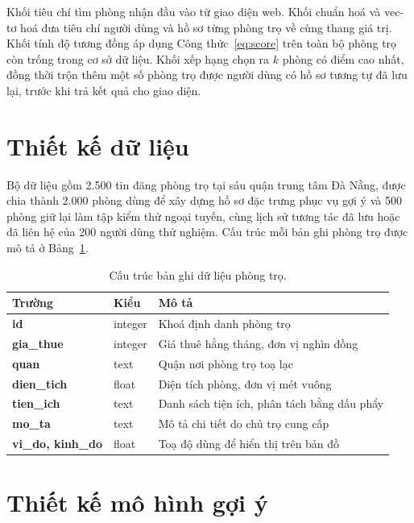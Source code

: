 Khối tiêu chí tìm phòng nhận đầu vào từ giao diện web. Khối chuẩn hoá và
vec-tơ hoá đưa tiêu chí người dùng và hồ sơ từng phòng trọ về cùng thang
giá trị. Khối tính độ tương đồng áp dụng Công thức~\eqref{eq:score} trên
toàn bộ phòng trọ còn trống trong cơ sở dữ liệu. Khối xếp hạng chọn ra
$k$ phòng có điểm cao nhất, đồng thời trộn thêm một số phòng trọ được người
dùng có hồ sơ tương tự đã lưu lại, trước khi trả kết quả cho giao diện.

\section{Thiết kế dữ liệu}

Bộ dữ liệu gồm 2.500 tin đăng phòng trọ tại sáu quận trung tâm Đà Nẵng,
được chia thành 2.000 phòng dùng để xây dựng hồ sơ đặc trưng phục vụ gợi ý
và 500 phòng giữ lại làm tập kiểm thử ngoại tuyến, cùng lịch sử tương tác
đã lưu hoặc đã liên hệ của 200 người dùng thử nghiệm. Cấu trúc mỗi bản ghi
phòng trọ được mô tả ở Bảng~\ref{tab:dulieu}.

\begin{table}[H]
\centering
\caption{Cấu trúc bản ghi dữ liệu phòng trọ.}
\label{tab:dulieu}
\begin{tabular*}{\textwidth}{@{\extracolsep{\fill}}>{\bfseries\color{daunavy}}l >{\color{daumaroon}}l l}
\toprule
\rowcolor{gray100}\bfseries\color{daunavy}Trường & \bfseries\color{daumaroon}Kiểu & \bfseries\color{daunavy}Mô tả \\
\midrule
id          & integer & Khoá định danh phòng trọ \\
gia\_thue   & integer & Giá thuê hằng tháng, đơn vị nghìn đồng \\
quan        & text    & Quận nơi phòng trọ toạ lạc \\
dien\_tich  & float   & Diện tích phòng, đơn vị mét vuông \\
tien\_ich   & text    & Danh sách tiện ích, phân tách bằng dấu phẩy \\
mo\_ta      & text    & Mô tả chi tiết do chủ trọ cung cấp \\
vi\_do, kinh\_do & float & Toạ độ dùng để hiển thị trên bản đồ \\
\bottomrule
\end{tabular*}
\end{table}

\section{Thiết kế mô hình gợi ý}

